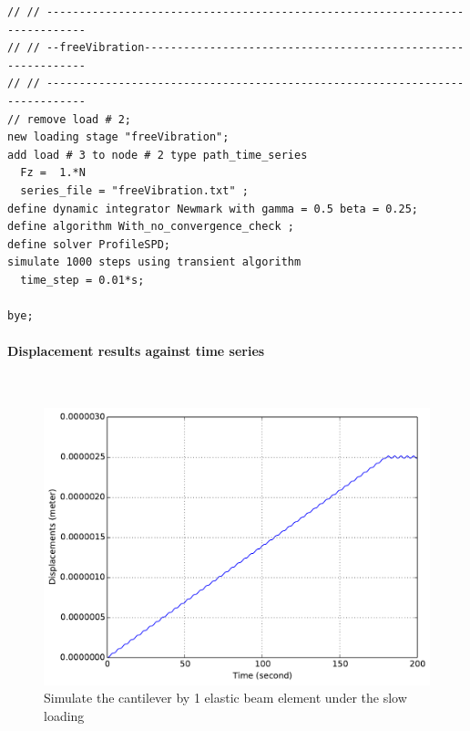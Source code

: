 \begin{lstlisting}
// // ----------------------------------------------------------------------------
// // --freeVibration-------------------------------------------------------------
// // ----------------------------------------------------------------------------
// remove load # 2;
new loading stage "freeVibration";
add load # 3 to node # 2 type path_time_series 
  Fz =  1.*N
  series_file = "freeVibration.txt" ;
define dynamic integrator Newmark with gamma = 0.5 beta = 0.25;
define algorithm With_no_convergence_check ;
define solver ProfileSPD;
simulate 1000 steps using transient algorithm 
  time_step = 0.01*s;

bye;
\end{lstlisting}

\paragraph{Displacement results against time series} ~

\begin{figure}[!htb]
  \centering
  \includegraphics[width=12cm]{./Figure-files/_Chapter_Appendix_Illustrative_Examples/beam-mass-1element-slowLoading.pdf}
  \caption{Simulate the cantilever by 1 elastic beam element under the slow loading}
  \label{fig_beam-mass-slow}
\end{figure}


